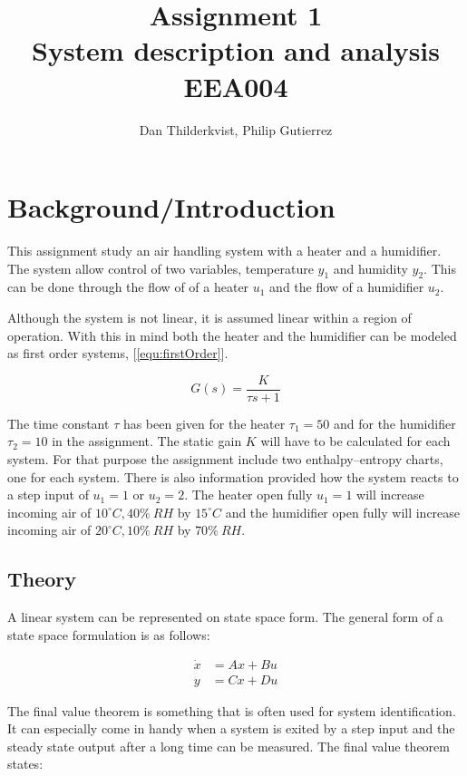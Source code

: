\documentclass[a4paper, titlepage]{article}
\title{Assignment 1\\
System description and analysis\\
\large EEA004}
\author{Dan Thilderkvist, Philip Gutierrez}
\begin{document}
\maketitle

\section{Background/Introduction}
This assignment study an air handling system with a heater and a humidifier.
The system allow control of two variables, temperature $y_1$ and humidity $y_2$.
This can be done through the flow of of a heater $u_1$ and the flow of a humidifier $u_2$.

Although the system is not linear, it is assumed linear within a region of operation.
With this in mind both the heater and the humidifier can be modeled as first order systems, [\ref{equ:firstOrder}].

\begin{equation}
G(s) = \frac{K}{\tau s + 1}
\label{equ:firstOrder}
\end{equation}

The time constant $\tau$ has been given for the heater $\tau_1=50$ and for the humidifier $\tau_2=10$ in the assignment.
The static gain $K$ will have to be calculated for each system.
For that purpose the assignment include two enthalpy–entropy charts, one for each system.
There is also information provided how the system reacts to a step input of $u_1 = 1$ or $u_2 = 2$.
The heater open fully $u_1 = 1$ will increase incoming air of $10^\circ C, 40\% \: RH$ by $15^\circ C$ and the humidifier open fully will increase incoming air of $20^\circ C, 10\% \: RH$ by $70\% \: RH$.

\subsection{Theory}
A linear system can be represented on state space form.
The general form of a state space formulation is as follows:

\begin{equation}
\begin{split}
\dot{x} &= Ax + Bu \\
y &= Cx + Du
\end{split}
\end{equation}


The final value theorem is something that is often used for system identification.
It can especially come in handy when a system is exited by a step input and the steady state output after a long time can be measured.
The final value theorem states:
\end{document}
